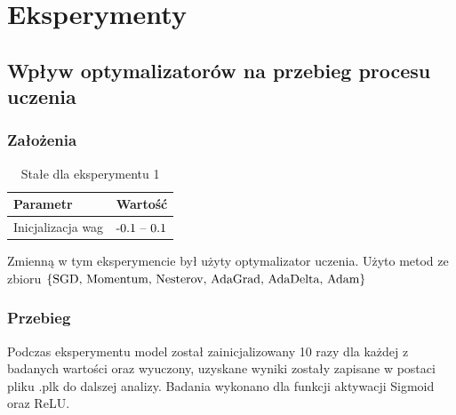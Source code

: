 \documentclass{article}
\begin{document}
\newpage
\section{Eksperymenty}

\subsection{Wpływ optymalizatorów na przebieg procesu uczenia}
\subsubsection*{Założenia}
\begin{table}[H]
	\caption{Stałe dla eksperymentu 1}
	\label{tabela-const-1}
	\centering
	\begin{tabular}{lr}
		\toprule
		Parametr          & Wartość         \\
		\midrule
		Inicjalizacja wag & \($-0.1 -- 0.1$\) \\
		\bottomrule
	\end{tabular}
\end{table}

Zmienną w tym eksperymencie był użyty optymalizator uczenia. Użyto metod ze zbioru \(\{$SGD, Momentum, Nesterov, AdaGrad, AdaDelta, Adam$\}\)
\subsubsection*{Przebieg}

Podczas eksperymentu model został zainicjalizowany 10 razy dla każdej z badanych wartości oraz wyuczony, uzyskane wyniki zostały zapisane w postaci pliku .plk do dalszej analizy. Badania wykonano dla funkcji aktywacji Sigmoid oraz ReLU.
\end{document}
